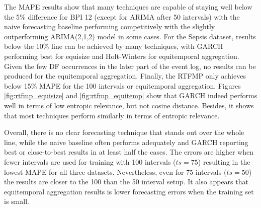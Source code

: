 The MAPE results show that many techniques are capable of staying well below the 5\% difference for BPI 12 (except for ARIMA after 50 intervals) with the naive forecasting baseline performing competitively with the slightly outperforming ARIMA(2,1,2) model in some cases.
For the Sepsis dataset, results below the 10\% line can be achieved by many techniques, with GARCH performing best for equisize and Holt-Winters for equitemporal aggregation.
Given the few DF occurrences in the later part of the event log, no results can be produced for the equitemporal aggregation.
Finally, the RTFMP only achieves below 15\% MAPE for the 100 intervals or equitemporal aggregation.
Figures \ref{fig:rtfmp_equisize} and \ref{fig:rtfmp_equitemp} show that GARCH indeed performs well in terms of low entropic relevance, but not cosine distance.
Besides, it shows that most techniques perform similarly in terms of entropic relevance.

Overall, there is no clear forecasting technique that stands out over the whole line, while the naive baseline often performs adequately and GARCH reporting best or close-to-best results in at least half the cases.
The errors are higher when fewer intervals are used for training with 100 intervals ($ts=75$) resulting in the lowest MAPE for all three datasets.
Nevertheless, even for 75 intervals ($ts=50$) the results are closer to the 100 than the 50 interval setup.
It also appears that equitemporal aggregation results is lower forecasting errors when the training set is small.

